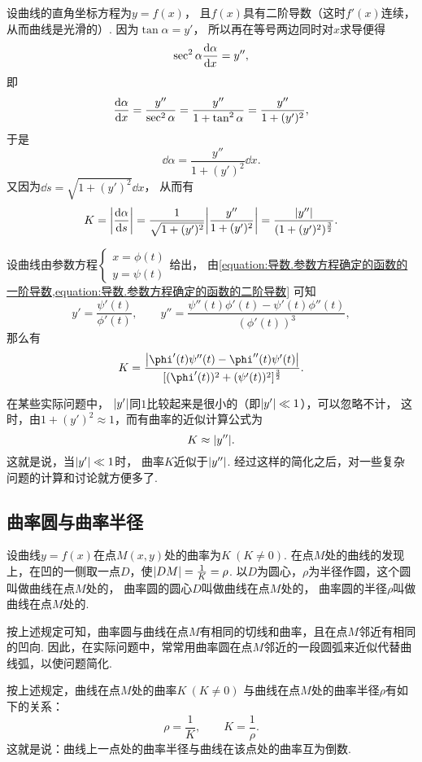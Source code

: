 设曲线的直角坐标方程为\(y=f(x)\)，
且\(f(x)\)具有二阶导数（这时\(f'(x)\)连续，从而曲线是光滑的）.
因为\(\tan\alpha = y'\)，
所以再在等号两边同时对\(x\)求导便得\[
	\sec^2\alpha \dv{\alpha}{x} = y'',
\]
即\[
	\dv{\alpha}{x}
	= \frac{y''}{\sec^2\alpha}
	= \frac{y''}{1 + \tan^2\alpha}
	= \frac{y''}{1 + (y')^2},
\]
于是\[
	\dd{\alpha}
	= \frac{y''}{1 + (y')^2} \dd{x}.
\]
又因为\(\dd{s} = \sqrt{1+(y')^2} \dd{x}\)，
从而有\begin{equation}
	K
	= \abs{\dv{\alpha}{s}}
	= \frac{1}{\sqrt{1+(y')^2}}
	\abs{\frac{y''}{1 + (y')^2}}
	= \frac{\abs{y''}}{(1+(y')^2)^{\frac32}}.
\end{equation}

设曲线由参数方程\(\left\{ \begin{array}{c}
	x = \phi(t) \\
	y = \psi(t)
\end{array} \right.\)给出，
由\cref{equation:导数.参数方程确定的函数的一阶导数,equation:导数.参数方程确定的函数的二阶导数}
可知\[
	y' = \frac{\psi'(t)}{\phi'(t)}, \qquad
	y'' = \frac{\psi''(t) \phi'(t) - \psi'(t) \phi''(t)}{(\phi'(t))^3},
\]
那么有\begin{equation}
	K = \frac{
		\abs{\phi'(t)\psi''(t)-\phi''(t)\psi'(t)}
	}{
		[(\phi'(t))^2+(\psi'(t))^2]^{\frac32}
	}.
\end{equation}

在某些实际问题中，
\(\abs{y'}\)同\(1\)比较起来是很小的（即\(\abs{y'} \ll 1\)），可以忽略不计，
这时，由\(1 + (y')^2 \approx 1\)，而有曲率的近似计算公式为\[
	K \approx \abs{y''}.
\]
这就是说，当\(\abs{y'} \ll 1\)时，
曲率\(K\)近似于\(\abs{y''}\).
经过这样的简化之后，对一些复杂问题的计算和讨论就方便多了.

\subsection{曲率圆与曲率半径}
设曲线\(y=f(x)\)在点\(M(x,y)\)处的曲率为\(K\ (K\neq0)\).
在点\(M\)处的曲线的发现上，在凹的一侧取一点\(D\)，使\(\abs{DM} = \frac{1}{K} = \rho\).
以\(D\)为圆心，\(\rho\)为半径作圆，这个圆叫做曲线在点\(M\)处的，
曲率圆的圆心\(D\)叫做曲线在点\(M\)处的，
曲率圆的半径\(\rho\)叫做曲线在点\(M\)处的.

按上述规定可知，曲率圆与曲线在点\(M\)有相同的切线和曲率，且在点\(M\)邻近有相同的凹向.
因此，在实际问题中，常常用曲率圆在点\(M\)邻近的一段圆弧来近似代替曲线弧，以使问题简化.

按上述规定，曲线在点\(M\)处的曲率\(K\ (K\neq0)\)
与曲线在点\(M\)处的曲率半径\(\rho\)有如下的关系：\[
	\rho = \frac{1}{K}, \qquad
	K = \frac{1}{\rho}.
\]
这就是说：曲线上一点处的曲率半径与曲线在该点处的曲率互为倒数.

